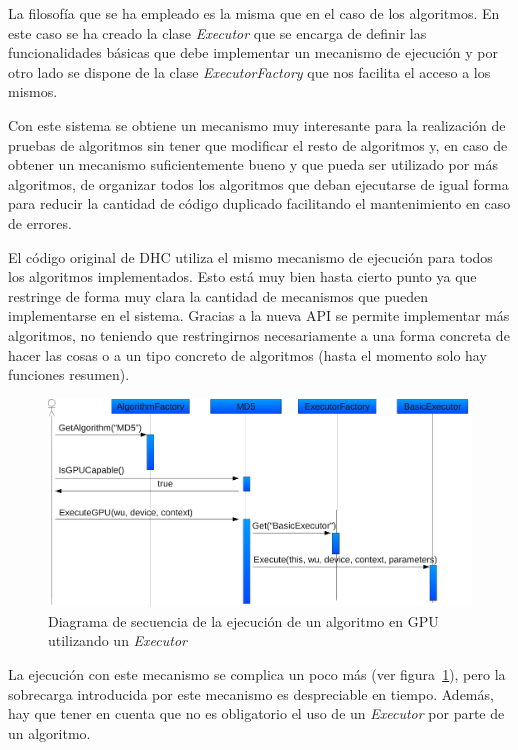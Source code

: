 La filosofía que se ha empleado es la misma que en el caso de los algoritmos. En este caso se ha creado la clase \emph{Executor} que se encarga de definir las funcionalidades básicas que debe implementar un mecanismo de ejecución y por otro lado se dispone de la clase \emph{ExecutorFactory} que nos facilita el acceso a los mismos.

Con este sistema se obtiene un mecanismo muy interesante para la realización de pruebas de algoritmos sin tener que modificar el resto de algoritmos y, en caso de obtener un mecanismo suficientemente bueno y que pueda ser utilizado por más algoritmos, de organizar todos los algoritmos que deban ejecutarse de igual forma para reducir la cantidad de código duplicado facilitando el mantenimiento en caso de errores.

El código original de DHC utiliza el mismo mecanismo de ejecución para todos los algoritmos implementados. Esto está muy bien hasta cierto punto ya que restringe de forma muy clara la cantidad de mecanismos que pueden implementarse en el sistema. Gracias a la nueva API se permite implementar más algoritmos, no teniendo que restringirnos necesariamente a una forma concreta de hacer las cosas o a un tipo concreto de algoritmos (hasta el momento solo hay funciones resumen).

\begin{figure}
	\centering
	\includegraphics[width=1\textwidth]{images/executor.pdf}
	\caption{Diagrama de secuencia de la ejecución de un algoritmo en GPU utilizando un \emph {Executor}}\label{fig:algotirmo_gpu_executor}
\end{figure}

La ejecución con este mecanismo se complica un poco más (ver figura~\ref{fig:algotirmo_gpu_executor}), pero la sobrecarga introducida por este mecanismo es despreciable en tiempo. Además, hay que tener en cuenta que no es obligatorio el uso de un \emph{Executor} por parte de un algoritmo.

